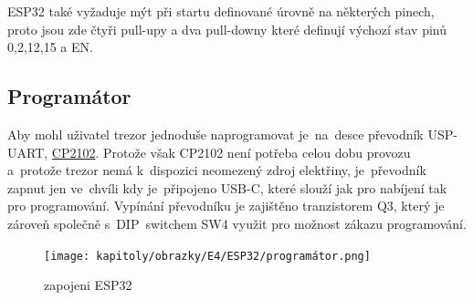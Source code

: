 ESP32 také vyžaduje mýt při startu definované úrovně na některých pinech, proto jsou zde čtyři pull-upy a dva pull-downy které definují výchozí stav
pinů 0,2,12,15 a EN. 
\begin{table}[h]
    \centering
    \caption{popis funkce pinu}
    \label{tab:COMPARATION}
\end{table}

\newpage

\subsection*{Programátor}
Aby mohl uživatel trezor jednoduše naprogramovat je~na~desce převodník USP-UART, \href{https://www.silabs.com/documents/public/data-sheets/cp2102n-datasheet.pdf}{CP2102}.
Protože však CP2102 není potřeba celou dobu provozu a~protože trezor nemá k~dispozici neomezený zdroj elektřiny, je~převodník zapnut jen ve~chvíli 
kdy je~připojeno USB-C, které slouží jak pro nabíjení tak pro programování. Vypínání převodníku je zajištěno tranzistorem Q3, který je zároveň společně
s~DIP~switchem SW4 využit pro možnost zákazu programování.

\begin{figure}[htbp]
    \centering
    \texttt{[image: kapitoly/obrazky/E4/ESP32/programátor.png]}
    \caption{zapojeni ESP32}
    \label{fig:E4-step-up}
\end{figure}

\newpage